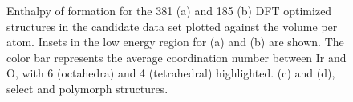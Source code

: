 \begin{figure}[!htb]
\centering
{}
\caption{\label{fig:E_vs_V}
Enthalpy of formation for the \num{381} \IrOtwo (a) and \num{185} \IrOthree (b) DFT optimized structures in the candidate data set plotted against the volume per atom.
%
Insets in the low energy region for (a) and (b) are shown.
%
The color bar represents the average coordination number between Ir and O, with 6 (octahedra) and 4 (tetrahedral) highlighted.
%
(c) and (d), select \IrOtwo and \IrOthree polymorph structures.
}
\end{figure}
